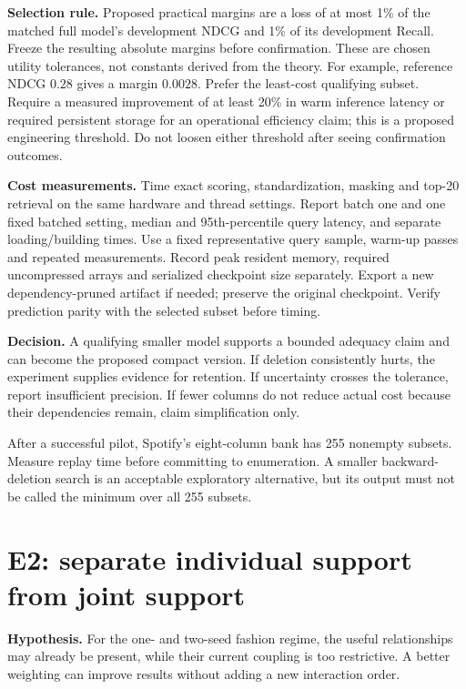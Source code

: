 \documentclass[11pt,a4paper]{article}
\begin{document}
\textbf{Selection rule.} Proposed practical margins are a loss of at most
1\% of the matched full model's development NDCG and 1\% of its development
Recall. Freeze the resulting absolute margins before confirmation. These
are chosen utility tolerances, not constants derived from the theory.
For example, reference NDCG $0.28$ gives a margin $0.0028$.
Prefer the least-cost qualifying subset. Require a measured improvement of
at least 20\% in warm inference latency or required persistent storage for
an operational efficiency claim; this is a proposed engineering threshold.
Do not loosen either threshold after seeing confirmation outcomes.

\textbf{Cost measurements.} Time exact scoring, standardization, masking
and top-20 retrieval on the same hardware and thread settings. Report batch
one and one fixed batched setting, median and 95th-percentile query latency,
and separate loading/building times. Use a fixed representative query sample,
warm-up passes and repeated measurements. Record peak resident memory,
required uncompressed arrays and serialized checkpoint size separately.
Export a new dependency-pruned artifact if needed; preserve the original
checkpoint. Verify prediction parity with the selected subset before timing.

\textbf{Decision.} A qualifying smaller model supports a bounded adequacy
claim and can become the proposed compact version. If deletion consistently
hurts, the experiment supplies evidence for retention. If uncertainty crosses
the tolerance, report insufficient precision. If fewer columns do not reduce
actual cost because their dependencies remain, claim simplification only.

After a successful pilot, Spotify's eight-column bank has 255 nonempty
subsets. Measure replay time before committing to enumeration. A smaller
backward-deletion search is an acceptable exploratory alternative, but its
output must not be called the minimum over all 255 subsets.

\section{E2: separate individual support from joint support}
\label{sec:e2}

\textbf{Hypothesis.} For the one- and two-seed fashion regime, the useful
relationships may already be present, while their current coupling is too
restrictive. A better weighting can improve results without adding a new
interaction order.
\end{document}

